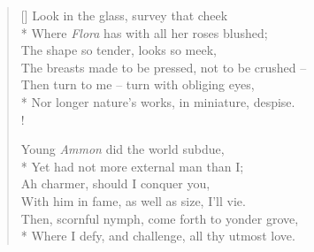 \documentclass[MAIN]{subfiles}
\begin{document}
\begin{verse}[\versewidth]
\vin \vin \vin Look in the glass, survey that cheek\\*
\vin Where \emph{Flora} has with all her roses blushed;\\
\vin \vin \vin The shape so tender, looks so meek,\\
\vin \vin The breasts made to be pressed, not to be crushed --\\
\vin Then turn to me -- turn with obliging eyes,\\*
Nor longer nature's works, in miniature, despise.\\!

\vin \vin \vin Young \emph{Ammon} did the world subdue,\\*
\vin Yet had not more external man than I;\\
\vin \vin \vin Ah charmer, should I conquer you,\\
\vin \vin With him in fame, as well as size, I'll vie.\\
\vin Then, scornful nymph, come forth to yonder grove,\\*
Where I defy, and challenge, all thy utmost love.
\end{verse}
\end{document}
